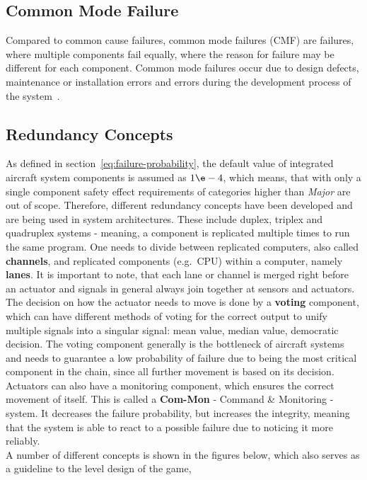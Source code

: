 \subsection{Common Mode Failure}\label{subsec:common-mode-failure}
Compared to common cause failures, common mode failures (CMF) are failures, where multiple components fail equally, where the reason
for failure may be different for each component.
Common mode failures occur due to design defects, maintenance or installation errors and errors during the development process
of the system~\cite{lfs2,cmf}.

\subsection{Redundancy Concepts}\label{subsec:redundancy-concepts}
As defined in section~\ref{eq:failure-probability}, the default value of integrated aircraft system components is assumed as
$1\e-4$, which means, that with only a single component safety effect requirements of categories higher than \textit{Major} are out of scope.
Therefore, different redundancy concepts have been developed and are being used in system architectures.
These include duplex, triplex and quadruplex systems - meaning, a component is replicated multiple times to run the same program.
One needs to divide between replicated computers, also called \textbf{channels}, and replicated components (e.g.\ CPU) within a computer,
namely \textbf{lanes}.
It is important to note, that each lane or channel is merged right before an actuator and signals in general always join together
at sensors and actuators.
\\
The decision on how the actuator needs to move is done by a \textbf{voting} component, which can have different methods of voting
for the correct output to unify multiple signals into a singular signal: mean value, median value, democratic decision.
The voting component generally is the bottleneck of aircraft systems and needs to guarantee a low probability of failure
due to being the most critical component in the chain, since all further movement is based on its decision.
\\
Actuators can also have a monitoring component, which ensures the correct movement of itself.
This is called a \textbf{Com-Mon} - Command \& Monitoring - system.
It decreases the failure probability, but increases the integrity, meaning that the system is able to react to a possible failure due
to noticing it more reliably.
\\
A number of different concepts is shown in the figures below, which also serves as a guideline to the level design of the game,
